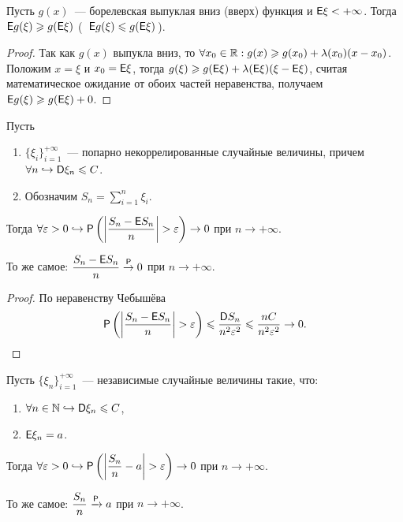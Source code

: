\begin{lemma}
	Пусть $g(x)$~--- борелевская выпуклая вниз (вверх) функция и $\E \xi < +\infty$. 
	Тогда $\E g(\xi) \geqslant g(\E \xi )$ (~$\E g(\xi) \leqslant g(\E \xi )$\,).
	\begin{proof}
		Так как $g(x)$ выпукла вниз, то $\forall x_0 \in \R : g(x) \geqslant g(x_0) + \lambda(x_0)(x - x_0)$. Положим $x = \xi$ и $x_0 = \E \xi$, тогда $g(\xi) \geqslant g(\E \xi) + \lambda(\E \xi)(\xi - \E \xi)$, считая математическое ожидание от обоих частей неравенства, получаем $\E g(\xi) \geqslant g( \E \xi ) + 0$.
	\end{proof}
\end{lemma}


\begin{theorem}
	Пусть 
	\begin{enumerate}
	    \item $\{\xi_i\}_{i=1}^{+\infty}$~---  попарно некоррелированные случайные величины, причем $\forall n \hookrightarrow \D \xi_n \leqslant C$.
	    \item Обозначим $S_n = \sum\limits_{i=1}^n \xi_i$.
	\end{enumerate} 
	Тогда $\forall \varepsilon > 0 \hookrightarrow \P \left(\left| \dfrac{S_n - \E S_n}{n} \right| > \varepsilon\right) \rightarrow 0$ при $n \rightarrow +\infty$.
	
	То же самое: $\dfrac{S_n - \E S_n}{n} \overset{\P}{\rightarrow} 0$ при $n \rightarrow +\infty$\Big.
	\begin{proof}
		По неравенству Чебышёва 
		$$\P \left(\left| \dfrac{S_n - \E S_n}{n} \right| > \varepsilon\right) \leqslant \dfrac{\D S_n}{n^2 \varepsilon^2} \leqslant \dfrac{nC}{n^2\varepsilon^2} \rightarrow 0.$$ 
	\end{proof}
\end{theorem}

\begin{consequence}
	Пусть $\{ \xi_n \}_{i=1}^{+\infty}$~--- независимые случайные величины такие, что:
	\begin{enumerate}
	    \item $\forall n \in \N \hookrightarrow \D \xi_n \leqslant C$,
	    \item $\E \xi_n = a$.
	\end{enumerate} 
	 Тогда $\forall \varepsilon > 0 \hookrightarrow \P \left(\left| \dfrac{S_n}{n} - a \right| > \varepsilon\right) \rightarrow 0$ при $n \rightarrow +\infty$.	
		
	То же самое: $\dfrac{S_n}{n} \xrightarrow{\P} a$ при $n \rightarrow + \infty$. 
\end{consequence}